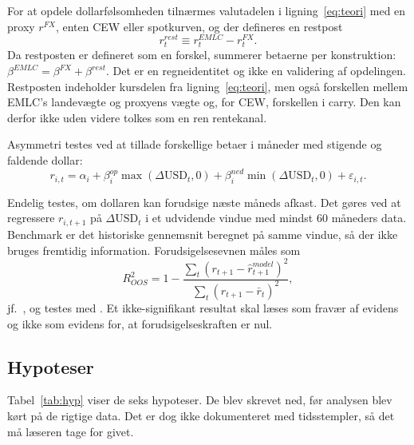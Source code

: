 \documentclass[11pt,a4paper]{article}
\begin{document}
For at opdele dollarfølsomheden tilnærmes valutadelen i ligning~\eqref{eq:teori} med en proxy $r^{FX}$, enten CEW eller spotkurven, og der defineres en restpost
\begin{equation}
r^{rest}_t \equiv r^{EMLC}_t - r^{FX}_t .
\end{equation}
Da restposten er defineret som en forskel, summerer betaerne per konstruktion: $\beta^{EMLC}=\beta^{FX}+\beta^{rest}$. Det er en regneidentitet og ikke en validering af opdelingen. Restposten indeholder kursdelen fra ligning~\eqref{eq:teori}, men også forskellen mellem EMLC's landevægte og proxyens vægte og, for CEW, forskellen i carry. Den kan derfor ikke uden videre tolkes som en ren rentekanal.

Asymmetri testes ved at tillade forskellige betaer i måneder med stigende og faldende dollar:
\begin{equation}\label{eq:asym}
r_{i,t} = \alpha_i + \beta^{op}_i \max(\Delta \mathrm{USD}_t,0) + \beta^{ned}_i \min(\Delta \mathrm{USD}_t,0) + \varepsilon_{i,t}.
\end{equation}

Endelig testes, om dollaren kan forudsige næste måneds afkast. Det gøres ved at regressere $r_{i,t+1}$ på $\Delta\mathrm{USD}_t$ i et udvidende vindue med mindst 60 måneders data. Benchmark er det historiske gennemsnit beregnet på samme vindue, så der ikke bruges fremtidig information. Forudsigelsesevnen måles som
\begin{equation}
R^2_{OOS} = 1 - \frac{\sum_t (r_{t+1} - \hat r^{model}_{t+1})^2}{\sum_t (r_{t+1} - \bar r_{t})^2},
\end{equation}
jf.\ \citet{campbell2008}, og testes med \citet{clark2007}. Et ikke-signifikant resultat skal læses som fravær af evidens og ikke som evidens for, at forudsigelseskraften er nul.

\subsection{Hypoteser}

Tabel~\ref{tab:hyp} viser de seks hypoteser. De blev skrevet ned, før analysen blev kørt på de rigtige data. Det er dog ikke dokumenteret med tidsstempler, så det må læseren tage for givet.
\end{document}
